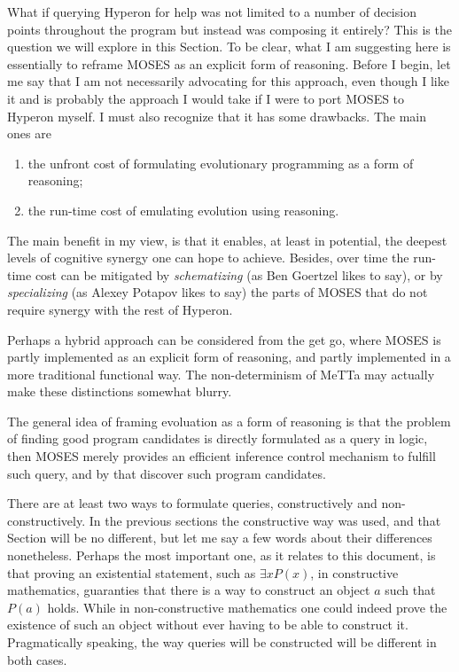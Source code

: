 \documentclass[]{report}
\begin{document}
What if querying Hyperon for help was not limited to a number of
decision points throughout the program but instead was composing it
entirely?  This is the question we will explore in this Section.  To
be clear, what I am suggesting here is essentially to reframe MOSES as
an explicit form of reasoning.  Before I begin, let me say that I am
not necessarily advocating for this approach, even though I like it
and is probably the approach I would take if I were to port MOSES to
Hyperon myself.  I must also recognize that it has some drawbacks.
The main ones are
\begin{enumerate}
\item the unfront cost of formulating evolutionary programming as a
  form of reasoning;
\item the run-time cost of emulating evolution using reasoning.
\end{enumerate}
The main benefit in my view, is that it enables, at least in
potential, the deepest levels of cognitive synergy one can hope to
achieve.  Besides, over time the run-time cost can be mitigated by
\emph{schematizing} (as Ben Goertzel likes to say), or by
\emph{specializing} (as Alexey Potapov likes to say) the parts of
MOSES that do not require synergy with the rest of Hyperon.

Perhaps a hybrid approach can be considered from the get go, where
MOSES is partly implemented as an explicit form of reasoning, and
partly implemented in a more traditional functional way.  The
non-determinism of MeTTa may actually make these distinctions somewhat
blurry.

The general idea of framing evoluation as a form of reasoning is that
the problem of finding good program candidates is directly formulated
as a query in logic, then MOSES merely provides an efficient inference
control mechanism to fulfill such query, and by that discover such
program candidates.

There are at least two ways to formulate queries, constructively and
non-constructively.  In the previous sections the constructive way was
used, and that Section will be no different, but let me say a few
words about their differences nonetheless.  Perhaps the most important
one, as it relates to this document, is that proving an existential
statement, such as $\exists x P(x)$, in constructive mathematics,
guaranties that there is a way to construct an object $a$ such that
$P(a)$ holds.  While in non-constructive mathematics one could indeed
prove the existence of such an object without ever having to be able
to construct it.  Pragmatically speaking, the way queries will be
constructed will be different in both cases.
\end{document}
